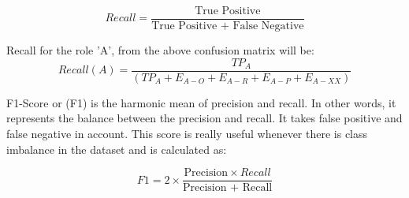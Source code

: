 \begin{equation}\label{eqn:recall}
Recall = \frac{\text{True Positive}}{\text{True Positive + False Negative}}
\end{equation}

Recall for the role 'A', from the above confusion matrix will be:
\[Recall(A) = \frac{TP_{A}}{(TP_{A}+E_{A-O}+E_{A-R}+E_{A-P}+E_{A-XX})}\]

\noindent F1-Score or (F1) is the harmonic mean of precision and recall. In other words, it represents the balance between the precision and recall. It takes false positive and false negative in account. This score is really useful whenever there is class imbalance in the dataset \cite{classification_scores:2009} and is calculated as:

\begin{equation}\label{eqn:precision}
F1 = 2\times \frac{\text{Precision} \times{Recall }}{\text{Precision + Recall}}
\end{equation}

\newpage



